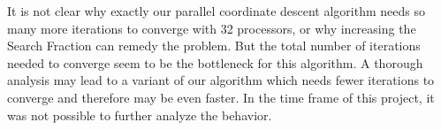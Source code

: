 It is not clear why exactly our parallel coordinate descent algorithm needs so many more iterations to converge with 32 processors, or why increasing the Search Fraction can remedy the problem. But the total number of iterations needed to converge seem to be the bottleneck for this algorithm. A thorough analysis may lead to a variant of our algorithm which needs fewer iterations to converge and therefore may be even faster. In the time frame of this project, it was not possible to further analyze the behavior.
